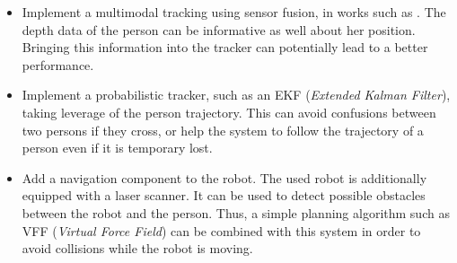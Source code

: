 \begin{itemize}
	\item Implement a multimodal tracking using sensor fusion, in works such as \cite{rgbd_tracking}. The depth data of the person can be informative as well about her position. Bringing this information into the tracker can potentially lead to a better performance.
	
	\item Implement a probabilistic tracker, such as an EKF (\textit{Extended Kalman Filter}), taking leverage of the person trajectory. This can avoid confusions between two persons if they cross, or help the system to follow the trajectory of a person even if it is temporary lost.
	
	\item Add a navigation component to the robot. The used robot is additionally equipped with a laser scanner. It can be used to detect possible obstacles between the robot and the person. Thus, a simple planning algorithm such as VFF (\textit{Virtual Force Field}) can be combined with this system in order to avoid collisions while the robot is moving.
\end{itemize}







